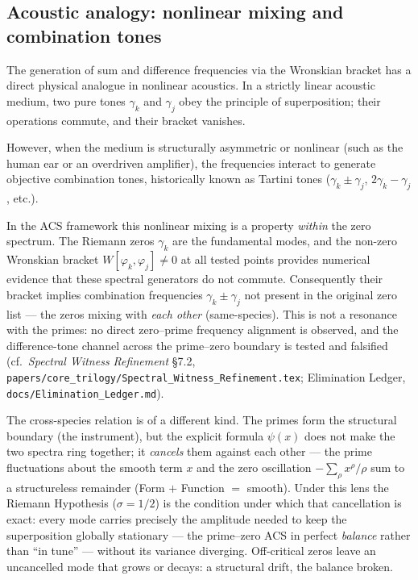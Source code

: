 \documentclass[12pt,a4paper]{article}
\theoremstyle{plain}
\theoremstyle{definition}
\theoremstyle{remark}
\begin{document}
\subsection{Acoustic analogy: nonlinear mixing and combination tones}

The generation of sum and difference frequencies via the Wronskian bracket has a
direct physical analogue in nonlinear acoustics. In a strictly linear acoustic medium,
two pure tones $\gamma_k$ and $\gamma_j$ obey the principle of superposition; their operations commute,
and their bracket vanishes.

However, when the medium is structurally asymmetric or nonlinear (such as the
human ear or an overdriven amplifier), the frequencies interact to generate objective
combination tones, historically known as Tartini tones ($\gamma_k \pm \gamma_j$, $2\gamma_k - \gamma_j$, etc.).

In the ACS framework this nonlinear mixing is a property \emph{within} the zero
spectrum. The Riemann zeros $\gamma_k$ are the fundamental modes, and the non-zero
Wronskian bracket $W[\varphi_k, \varphi_j] \neq 0$ at all tested points provides
numerical evidence that these spectral generators do not commute. Consequently their
bracket implies combination frequencies $\gamma_k \pm \gamma_j$ not present in the
original zero list --- the zeros mixing with \emph{each other} (same-species). This is
not a resonance with the primes: no direct zero--prime frequency alignment is observed,
and the difference-tone channel across the prime--zero boundary is tested and falsified
(cf.\ \emph{Spectral Witness Refinement} \S7.2, \nolinkurl{papers/core_trilogy/Spectral_Witness_Refinement.tex}; Elimination Ledger, \nolinkurl{docs/Elimination_Ledger.md}).

The cross-species relation is of a different kind. The primes form the structural
boundary (the instrument), but the explicit formula $\psi(x)$ does not make the two
spectra ring together; it \emph{cancels} them against each other --- the prime
fluctuations about the smooth term $x$ and the zero oscillation
$-\sum_\rho x^\rho/\rho$ sum to a structureless remainder (Form $+$ Function $=$ smooth).
Under this lens the Riemann Hypothesis ($\sigma = 1/2$) is the condition under which that
cancellation is exact: every mode carries precisely the amplitude needed to keep the
superposition globally stationary --- the prime--zero ACS in perfect \emph{balance}
rather than ``in tune'' --- without its variance diverging. Off-critical zeros leave an
uncancelled mode that grows or decays: a structural drift, the balance broken.
\end{document}
